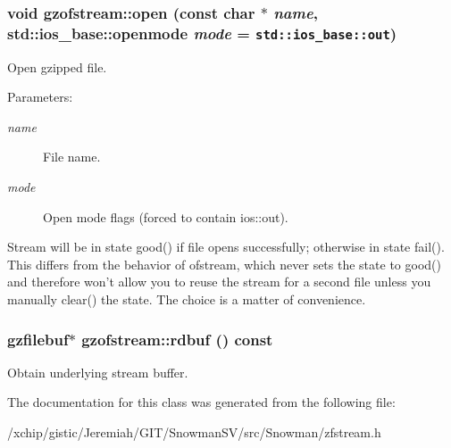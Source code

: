 \subsubsection{\setlength{\rightskip}{0pt plus 5cm}void gzofstream::open (const char $\ast$ {\em name}, std::ios\_\-base::openmode {\em mode} = {\tt std::ios\_\-base::out})}\label{classgzofstream_9681d9b32b9ef2071d3e81d4a9269565}


Open gzipped file. 

\begin{Desc}
\item[Parameters:]
\begin{description}
\item[{\em name}]File name. \item[{\em mode}]Open mode flags (forced to contain ios::out).\end{description}
\end{Desc}
Stream will be in state good() if file opens successfully; otherwise in state fail(). This differs from the behavior of ofstream, which never sets the state to good() and therefore won't allow you to reuse the stream for a second file unless you manually clear() the state. The choice is a matter of convenience. 
\subsubsection{\setlength{\rightskip}{0pt plus 5cm}\bf{gzfilebuf}$\ast$ gzofstream::rdbuf () const\hspace{0.3cm}{\tt  [inline]}}\label{classgzofstream_e4dca39204fe5cad1cd46d963181033a}


Obtain underlying stream buffer. 

The documentation for this class was generated from the following file:\begin{CompactItemize}
\item 
/xchip/gistic/Jeremiah/GIT/Snowman\-SV/src/Snowman/zfstream.h\end{CompactItemize}
